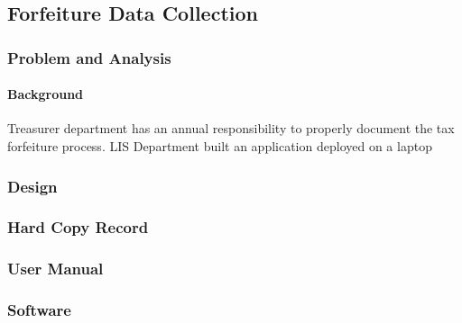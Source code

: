 \documentclass[class=article , crop=false, titlepage, twoside, multi={itemize, figure, verbatim}, float=false]{standalone}
\title{}  %
\begin{document}

\ifstandalone
\maketitle %
\clearpage
\tableofcontents %
\clearpage
\fi

\subsection{Forfeiture Data Collection}

\subsubsection{Problem and Analysis}
\paragraph{Background}
Treasurer department has an annual responsibility to properly document the tax forfeiture process.  LIS Department built an application deployed on a laptop
\clearpage
\subsubsection{Design}
\clearpage
\subsubsection{Hard Copy Record}
\clearpage
\subsubsection{User Manual}
\clearpage
\subsubsection{Software}
\clearpage
\end{document}
